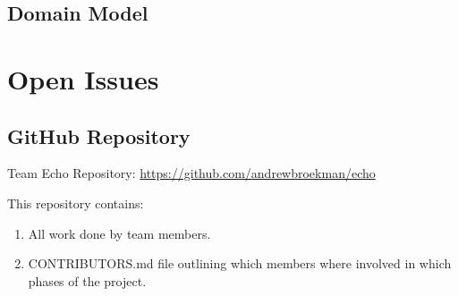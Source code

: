 \documentclass[a4paper,10pt]{article}
\begin{document}
\subsection{Domain Model}

\section{Open Issues}
\subsection {GitHub Repository}
Team Echo Repository: \url{https://github.com/andrewbroekman/echo}

This repository contains:
\begin{enumerate}
\item All work done by team members.
\item CONTRIBUTORS.md file outlining which members where involved in which phases of the project.
\end{enumerate}
\end{document}

